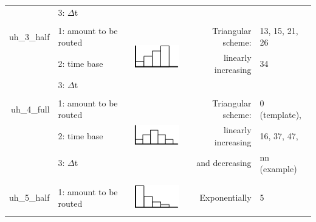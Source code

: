 \begin{table}[ht!]
\begin{tabular}{rp{10.57em}lrl}
          & 3: $\Delta$t &       &       &  \\
          & \multicolumn{1}{l}{} &       &       &  \\
    \multicolumn{1}{p{6.215em}}{uh\_3\_half} & 1: amount to be routed & \multirow{3}[0]{*}{ \begin{minipage}{3cm} \includegraphics[height=1.3cm]{./AppC_graphics/uh3} \end{minipage} } & \multicolumn{1}{p{8.43em}}{Triangular scheme:} & \multicolumn{1}{p{6.07em}}{13, 15, 21, 26} \\
          & 2: time base &       & \multicolumn{1}{p{8.43em}}{linearly increasing} & 34 \\
          & 3: $\Delta$t &       &       &  \\
          & \multicolumn{1}{l}{} &       &       &  \\
    \multicolumn{1}{p{6.215em}}{uh\_4\_full} & 1: amount to be routed & \multirow{3}[0]{*}{ \begin{minipage}{3cm} \includegraphics[height=1.3cm]{./AppC_graphics/uh4} \end{minipage} } & \multicolumn{1}{p{8.43em}}{Triangular scheme:} & \multicolumn{1}{p{6.07em}}{0 (template), } \\
          & 2: time base &       & \multicolumn{1}{p{8.43em}}{linearly increasing} & \multicolumn{1}{p{6.07em}}{16, 37, 47,} \\
          & 3: $\Delta$t &       & \multicolumn{1}{p{8.43em}}{and decreasing} & \multicolumn{1}{p{6.07em}}{nn (example)} \\
          & \multicolumn{1}{l}{} &       &       &  \\
    \multicolumn{1}{p{6.215em}}{uh\_5\_half} & 1: amount to be routed & \multirow{3}[0]{*}{ \begin{minipage}{3cm} \includegraphics[height=1.3cm]{./AppC_graphics/uh5} \end{minipage} } & \multicolumn{1}{p{8.43em}}{Exponentially} & 5 \\

\end{tabular}
\end{table}
